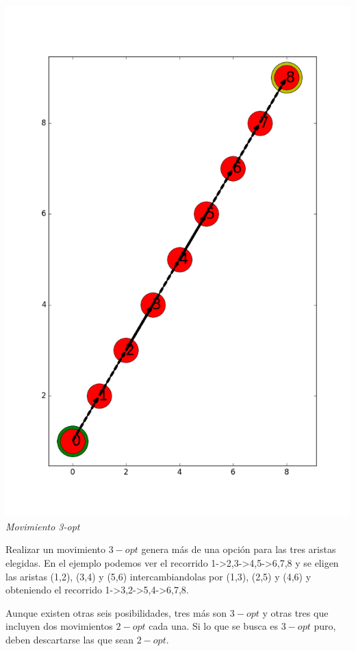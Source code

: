   \vspace*{0.3cm} \vspace*{0.3cm}
  \begin{center}
 \includegraphics[scale=0.3]{./EJ3/ejemplo3optCaso1.png}\\
 {            \textit{Movimiento 3-opt}}
  \end{center}
  \vspace*{0.3cm}
  
Realizar un movimiento $3-opt$ genera más de una opción para las tres aristas elegidas.
En el ejemplo podemos ver el recorrido 1->2,3->4,5->6,7,8 y se eligen las aristas (1,2), (3,4) y (5,6) intercambiandolas por (1,3), (2,5) y (4,6) y obteniendo el recorrido 1->3,2->5,4->6,7,8.

Aunque existen otras seis posibilidades, tres más son $3-opt$ y otras tres que incluyen dos movimientos $2-opt$ cada una. Si lo que se busca es $3-opt$ puro, deben descartarse las que sean $2-opt$.

